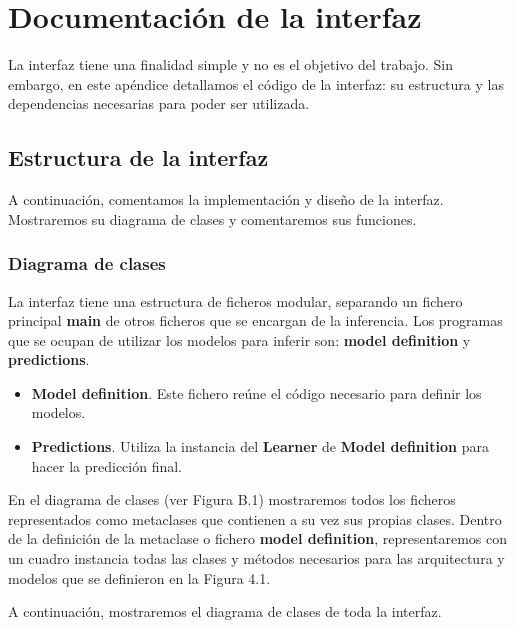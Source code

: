 \chapter{Documentación de la interfaz}


La interfaz tiene una finalidad simple y no es el objetivo del trabajo.  Sin embargo, en este apéndice detallamos el código de la interfaz: su estructura y las dependencias necesarias para poder ser utilizada.

\section{Estructura de la interfaz}

A continuación, comentamos la implementación y diseño de la interfaz. Mostraremos su diagrama de clases y comentaremos sus funciones.

\subsection{Diagrama de clases}

La interfaz tiene una estructura de ficheros modular, separando un fichero principal \textbf{main} de otros ficheros que se encargan de la inferencia. Los programas que se ocupan de utilizar los modelos para inferir son: \textbf{model definition} y \textbf{predictions}. 
\begin{itemize}
	\item \textbf{Model definition}. Este fichero reúne el código necesario para definir los modelos.
	\item \textbf{Predictions}. Utiliza la instancia del \textbf{Learner} de \textbf{Model definition} para hacer la predicción final.
\end{itemize}

En el diagrama de clases (ver Figura B.1) mostraremos todos los ficheros representados como metaclases que contienen a su vez sus propias clases. Dentro de la definición de la metaclase o fichero \textbf{model definition}, representaremos con un cuadro instancia todas las clases y métodos necesarios para las arquitectura y modelos que se definieron en la Figura 4.1.

A continuación, mostraremos el diagrama de clases de toda la interfaz.

